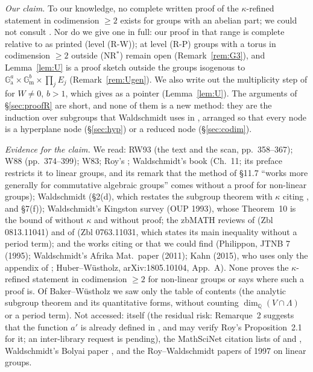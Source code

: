 \documentclass[11pt]{amsart}
\theoremstyle{definition}
\newcommand{\Q}{\mathbb{Q}}
\newcommand{\Ga}{\mathbb{G}_{\mathrm a}}
\newcommand{\Gm}{\mathbb{G}_{\mathrm m}}
\begin{document}
\emph{Our claim.} To our knowledge, no complete written proof of the $\kappa$-refined statement in codimension $\ge2$ exists
for groups with an abelian part; we could not consult \cite{R1}. Nor do we give one in full: our proof in that range is
complete relative to \cite[Thm.~4.1]{W88} as printed (level (R-W)); at level (R-P) groups with a torus in codimension
$\ge2$ outside (NR$^*$) remain open (Remark~\ref{rem:G3}), and Lemma~\ref{lem:U} is a proof sketch outside the groups
isogenous to $\Ga^a\times\Gm^b\times\prod_jE_j$ (Remark~\ref{rem:Ugen}). We also write out the multiplicity step of
\cite[Thm.~4.1]{W88} for $W\ne0$, $b>1$, which \cite[p.~396]{W88} gives as a pointer (Lemma~\ref{lem:U}). The arguments of
\S\ref{sec:proofR} are short, and none of them is a new method: they are the induction over subgroups that Waldschmidt
uses in \cite[\S5]{W88}, arranged so that every node is a hyperplane node (\S\ref{sec:hyp}) or a reduced node
(\S\ref{sec:codim}).

\emph{Evidence for the claim.} We read: RW93 (the text and the scan, pp.~358--367); W88 (pp.~374--399); W83; Roy's
\cite{Roy92}; Waldschmidt's book \cite{W00} (Ch.~11; its preface restricts it to linear groups, and its remark that the method
of \S11.7 ``works more generally for commutative algebraic groups'' comes without a proof for non-linear groups); Waldschmidt
\cite{W97} (\S2(d), which restates the subgroup theorem with $\kappa$ citing \cite[Thm.~4.1]{W88}, and \S7(f)); Waldschmidt's
Kingston survey (OUP 1993), whose Theorem~10 is the bound of \cite{RW93} without $\kappa$ and without proof; the zbMATH reviews
of \cite{RW93} (Zbl 0813.11041) and of \cite{R1} (Zbl 0763.11031, which states its main inequality without a period term);
and the works citing \cite{RW93} or \cite{R1} that we could find (Philippon, JTNB 7 (1995); Waldschmidt's Afrika Mat.\ paper
(2011); Kahn (2015), who uses only the appendix of \cite{RW93}; Huber--W\"ustholz, arXiv:1805.10104, App.~A). None proves
the $\kappa$-refined statement in codimension $\ge2$ for non-linear groups or says where such a proof is. Of Baker--W\"ustholz
\cite{BW07} we saw only the table of contents (the analytic subgroup theorem and its quantitative forms, without counting
$\dim_\Q(V\cap\Lambda)$ or a period term). Not accessed: \cite{R1} itself (the residual risk: Remarque~2 suggests that the
function $a'$ is already defined in \cite[\S6]{R1}, and \cite[\S6]{R1} may verify Roy's Proposition~2.1 for it; an
inter-library request is pending), the MathSciNet citation lists of \cite{RW93} and \cite{R1}, Waldschmidt's Bolyai paper
\cite{W90}, and the Roy--Waldschmidt papers of 1997 on linear groups.
\end{document}
